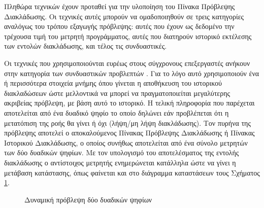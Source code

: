 Πληθώρα τεχνικών έχουν προταθεί για την υλοποίηση του Πίνακα Πρόβλεψης Διακλάδωσης. Οι τεχνικές αυτές μπορούν να ομαδοποιηθούν σε τρεις κατηγορίες αναλόγως του τρόπου εξαγωγής πρόβλεψης: αυτές που έχουν ως δεδομένο την τρέχουσα τιμή του μετρητή προγράμματος, αυτές που διατηρούν ιστορικό εκτέλεσης των εντολών διακλάδωσης, και τέλος τις συνδυαστικές.
\par
Οι τεχνικές που χρησιμοποιούνται ευρέως στους σύγχρονους επεξεργαστές ανήκουν στην κατηγορία των συνδυαστικών προβλεπτών \cite{cummins2001branch}. Για το λόγο αυτό χρησιμοποιούν ένα ή περισσότερα στοιχεία μνήμης όπου γίνεται η αποθήκευση του ιστορικού διακλαδώσεων ώστε μελλοντικά να μπορεί να πραγματοποιείται μεγαλύτερης ακριβείας πρόβλεψη, με βάση αυτό το ιστορικό. Η τελική πληροφορία που παρέχεται αποτελείται από ένα δυαδικό ψηφίο το οποίο δηλώνει εάν προβλέπεται ότι η μετατόπιση της ροής θα γίνει ή όχι (λήψη/μη λήψη διακλάδωσης). Τον πυρήνα της πρόβλεψης αποτελεί ο αποκαλούμενος Πίνακας Πρόβλεψης Διακλάδωσης ή Πίνακας Ιστορικού Διακλάδωσης, ο οποίος συνήθως αποτελείται από ένα σύνολο μετρητών των δύο δυαδικών ψηφίων. Με τον υπολογισμό του αποτελέσματος της εντολής διακλάδωσης ο αντίστοιχος μετρητής ενημερώνεται κατάλληλα ώστε να γίνει η μετάβαση κατάστασης, όπως φαίνεται και στο διάγραμμα καταστάσεων τους Σχήματος \ref{fig:chap2_2bit_prediction_fsm}.

\begin{figure}[t]
    \centering
    \caption{Δυναμική πρόβλεψη δύο δυαδικών ψηφίων}
    \label{fig:chap2_2bit_prediction_fsm}
\end{figure}

